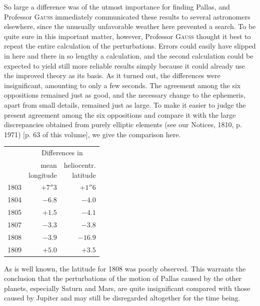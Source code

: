 \par\indent So large a difference was of the utmost importance for finding Pallas, and Professor \textsc{Gauss} immediately communicated these results to several astronomers elsewhere, since the unusually unfavorable weather here prevented a search. To be quite sure in this important matter, however, Professor \textsc{Gauss} thought it best to repeat the entire calculation of the perturbations. Errors could easily have slipped in here and there in so lengthy a calculation, and the second calculation could be expected to yield still more reliable results simply because it could already use the improved theory as its basis. As it turned out, the differences were insignificant, amounting to only a few seconds. The agreement among the six oppositions remained just as good, and the necessary change to the ephemeris, apart from small details, remained just as large. To make it easier to judge the present agreement among the six oppositions and compare it with the large discrepancies obtained from purely elliptic elements (see our Notices, 1810, p. 1971) [p. 63 of this volume], we give the comparison here.
\begin{center}\fontsize{10}{12}\selectfont\setlength{\tabcolsep}{4pt}\renewcommand{\arraystretch}{1.15}\begin{tabular}{r|r|r}
 & \multicolumn{2}{c}{Differences in}\\
 & \shortstack{mean\\longitude} & \shortstack{heliocentr.\\latitude}\\\hline
1803 & $+7''3$ & $+1''6$\\
1804 & $-6.8$ & $-4.0$\\
1805 & $+1.5$ & $-4.1$\\
1807 & $-3.3$ & $-3.8$\\
1808 & $-3.9$ & $-16.9$\\
1809 & $+5.0$ & $+3.5$\\
\end{tabular}\end{center}

\par\indent As is well known, the latitude for 1808 was poorly observed. This warrants the conclusion that the perturbations of the motion of Pallas caused by the other planets, especially Saturn and Mars, are quite insignificant compared with those caused by Jupiter and may still be disregarded altogether for the time being.

